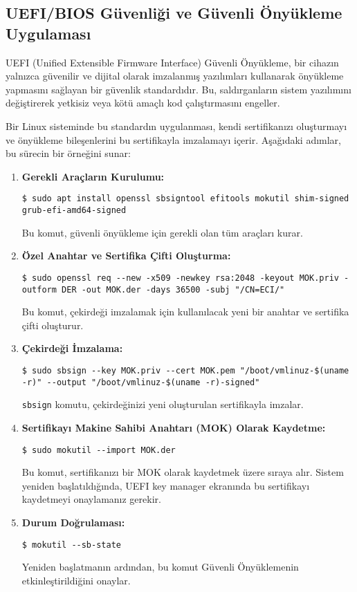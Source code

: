 \subsection{UEFI/BIOS Güvenliği ve Güvenli Önyükleme Uygulaması}

UEFI (Unified Extensible Firmware Interface) Güvenli Önyükleme, bir cihazın yalnızca güvenilir ve dijital olarak imzalanmış yazılımları kullanarak önyükleme yapmasını sağlayan bir güvenlik standardıdır. Bu, saldırganların sistem yazılımını değiştirerek yetkisiz veya kötü amaçlı kod çalıştırmasını engeller.

Bir Linux sisteminde bu standardın uygulanması, kendi sertifikanızı oluşturmayı ve önyükleme bileşenlerini bu sertifikayla imzalamayı içerir. Aşağıdaki adımlar, bu sürecin bir örneğini sunar:

\begin{enumerate}
    \item \textbf{Gerekli Araçların Kurulumu:}
    \begin{lstlisting}[breaklines=true,basicstyle=\ttfamily\footnotesize]
$ sudo apt install openssl sbsigntool efitools mokutil shim-signed grub-efi-amd64-signed
    \end{lstlisting}
    Bu komut, güvenli önyükleme için gerekli olan tüm araçları kurar.
    \item \textbf{Özel Anahtar ve Sertifika Çifti Oluşturma:}
    \begin{lstlisting}[breaklines=true,basicstyle=\ttfamily\footnotesize]
$ sudo openssl req --new -x509 -newkey rsa:2048 -keyout MOK.priv -outform DER -out MOK.der -days 36500 -subj "/CN=ECI/"
    \end{lstlisting}
    Bu komut, çekirdeği imzalamak için kullanılacak yeni bir anahtar ve sertifika çifti oluşturur.
    \item \textbf{Çekirdeği İmzalama:}
    \begin{lstlisting}[breaklines=true,basicstyle=\ttfamily\footnotesize]
$ sudo sbsign --key MOK.priv --cert MOK.pem "/boot/vmlinuz-$(uname -r)" --output "/boot/vmlinuz-$(uname -r)-signed"
    \end{lstlisting}
    \verb|sbsign| komutu, çekirdeğinizi yeni oluşturulan sertifikayla imzalar.
    \item \textbf{Sertifikayı Makine Sahibi Anahtarı (MOK) Olarak Kaydetme:}
    \begin{verbatim}
$ sudo mokutil --import MOK.der
    \end{verbatim}
    Bu komut, sertifikanızı bir MOK olarak kaydetmek üzere sıraya alır. Sistem yeniden başlatıldığında, UEFI key manager ekranında bu sertifikayı kaydetmeyi onaylamanız gerekir.
    \item \textbf{Durum Doğrulaması:}
    \begin{verbatim}
$ mokutil --sb-state
    \end{verbatim}
    Yeniden başlatmanın ardından, bu komut Güvenli Önyüklemenin etkinleştirildiğini onaylar.
\end{enumerate}

